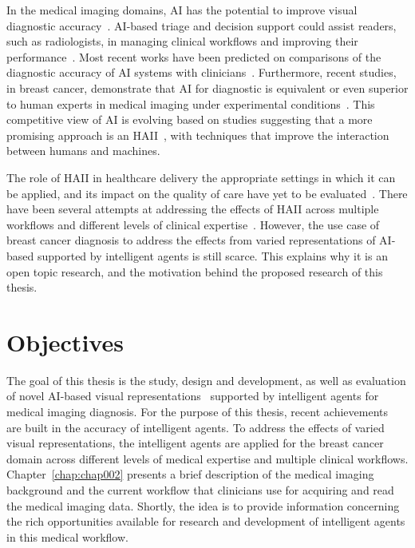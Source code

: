 In the medical imaging domains, \ac{AI} has the potential to improve visual diagnostic accuracy~\cite{Tschandl2020}.
\ac{AI}-based triage and decision support could assist readers, such as radiologists, in managing clinical workflows and improving their performance~\cite{doi:10.1148/ryai.2020190208}.
Most recent works have been predicted on comparisons of the diagnostic accuracy of \ac{AI} systems with clinicians~\cite{He2019, 10.1145/3313831.3376290}.
Furthermore, recent studies, in breast cancer, demonstrate that AI for diagnostic is equivalent or even superior to human experts in medical imaging under experimental conditions~\cite{Ribli2018, McKinney2020}.
This competitive view of AI is evolving based on studies suggesting that a more promising approach is an \ac{HAII}~\cite{10.1145/3313831.3376807, 10.1145/3290605.3300233, 10.1145/3411286, 10.1145/3313831.3376301}, with techniques that improve the interaction between humans and machines.

The role of \ac{HAII} in healthcare delivery the appropriate settings in which it can be applied, and its impact on the quality of care have yet to be evaluated~\cite{Tschandl2020}.
There have been several attempts at addressing the effects of \ac{HAII} across multiple workflows and different levels of clinical expertise~\cite{doi:10.1148/radiol.2019182627, doi:10.1148/ryai.2020200057}.
However, the use case of breast cancer diagnosis to address the effects from varied representations of \ac{AI}-based supported by intelligent agents is still scarce.
This explains why it is an open topic research, and the motivation behind the proposed research of this thesis.

\section{Objectives}
\label{sec:chap001002}

The goal of this thesis is the study, design and development, as well as evaluation of novel \ac{AI}-based visual representations~\cite{https://doi.org/10.13140/rg.2.2.29816.70409} supported by intelligent agents for medical imaging diagnosis.
For the purpose of this thesis, recent achievements~\cite{Tschandl2020, 9098470, MAICAS2019101562} are built in the accuracy of intelligent agents.
To address the effects of varied visual representations, the intelligent agents are applied for the breast cancer domain across different levels of medical expertise and multiple clinical workflows.
Chapter~\ref{chap:chap002} presents a brief description of the medical imaging background and the current workflow that clinicians use for acquiring and read the medical imaging data.
Shortly, the idea is to provide information concerning the rich opportunities available for research and development of intelligent agents in this medical workflow.

